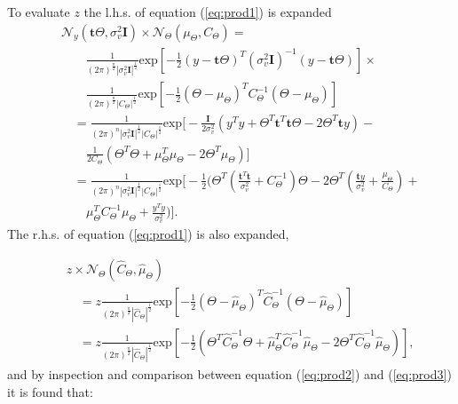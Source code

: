 To evaluate $z$ the l.h.s. of equation (\ref{eq:prod1}) is expanded
{\setlength\arraycolsep{2pt}
\begin{eqnarray}
\label{eq:prod2} & & \mathcal{N}_y(\textbf{t}\Theta,\sigma_v^2 \textbf{I})\times\mathcal{N}_\Theta(\mu_\Theta,C_\Theta) = \\\nonumber
& & \qquad \frac{1}{(2\pi)^{\frac{n}{2}} |\sigma_v^2\textbf{I}|^{\frac{1}{2}}} \textrm{exp}\left[-\frac{1}{2}(y - \textbf{t}\Theta)^T(\sigma_v^2 \textbf{I})^{-1}(y - \textbf{t}\Theta)\right] \times {} \\\nonumber
& & \qquad \frac{1}{(2\pi)^{\frac{n}{2}}|C_\Theta|^{\frac{1}{2}}} \textrm{exp}\left[-\frac{1}{2}(\Theta - \mu_\Theta)^TC_\Theta^{-1}(\Theta - \mu_\Theta)\right] \\\nonumber
& & \quad= \frac{1}{(2\pi)^n |\sigma_v^2\textbf{I}|^{\frac{1}{2}} |C_\Theta|^{\frac{1}{2}}} \textrm{exp}\bigg[-\frac{\textbf{I}}{2\sigma_v^2}\left(y^Ty+\Theta^T\textbf{t}^T\textbf{t}\Theta - 2 \Theta^T\textbf{t}y\right) - {} \\\nonumber
& & \qquad \frac{1}{2C_\Theta} \left(\Theta^T\Theta + \mu_\Theta^T\mu_\Theta - 2 \Theta^T\mu_\Theta\right) \bigg] \\\nonumber
& & \quad = \frac{1}{(2\pi)^n |\sigma_v^2\textbf{I}|^{\frac{1}{2}} |C_\Theta|^{\frac{1}{2}}} \textrm{exp}\Bigg[-\frac{1}{2}\Bigg(\Theta^T\left(\frac{\textbf{t}^T\textbf{t}}{\sigma_v^2} + C_\Theta^{-1}\right)\Theta - 2 \Theta^T\left(\frac{\textbf{t}y}{\sigma_v^2} + \frac{\mu_\Theta}{C_\Theta}\right) + {}\\\nonumber
& & \qquad \mu_\Theta^TC_\Theta^{-1}\mu_\Theta + \frac{y^Ty}{\sigma_v^2}\Bigg)\Bigg].
\end{eqnarray}}
The r.h.s. of equation (\ref{eq:prod1}) is also expanded,

{\setlength\arraycolsep{2pt}
\begin{eqnarray}
\label{eq:prod3} & & z \times \mathcal{N}_\Theta(\hat{C}_\Theta,\hat{\mu}_\Theta) \\\nonumber
& & \quad = z\frac{1}{(2\pi)^{\frac{n}{2}} |\hat{C}_\Theta|^{\frac{1}{2}}} \textrm{exp}\left[-\frac{1}{2}\left(\Theta - \hat{\mu}_\Theta\right)^T\hat{C}_\Theta^{-1}\left(\Theta - \hat{\mu}_\Theta\right)\right] \\\nonumber
& & \quad = z\frac{1}{(2\pi)^{\frac{n}{2}} |\hat{C}_\Theta|^{\frac{1}{2}}} \textrm{exp}\left[-\frac{1}{2}\left(\Theta^T\hat{C}_\Theta^{-1}\Theta + \hat{\mu}_\Theta^T\hat{C}_\Theta^{-1}\hat{\mu}_\Theta - 2\Theta^T\hat{C}_\Theta^{-1}\hat{\mu}_\Theta\right)\right],
\end{eqnarray}}
and by inspection and comparison between equation (\ref{eq:prod2}) and (\ref{eq:prod3}) it is found that:

